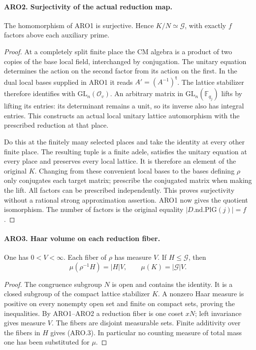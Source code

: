 \paragraph{ARO2. Surjectivity of the actual reduction map.}
\label{claim:ARO2}
The homomorphism of ARO1 is surjective.  Hence
\(K/N\simeq\mathcal G\), with exactly \(f\) factors above each
auxiliary prime.
\begin{proof}
At a completely split finite place the CM algebra is a product of
two copies of the base local field, interchanged by conjugation.
The unitary equation determines the action on the second factor
from its action on the first.  In the dual local bases supplied in
ARO1 it reads \(A'=(A^{-1})^{\mathsf t}\).  The lattice stabilizer
therefore identifies with \(\mathrm{GL}_n(\mathcal O_v)\).
An arbitrary matrix in \(\mathrm{GL}_n(\mathbb F_{q_j})\) lifts by
lifting its entries: its determinant remains a unit, so its inverse
also has integral entries.  This constructs an actual local unitary
lattice automorphism with the prescribed reduction at that place.

Do this at the finitely many selected places and take the identity
at every other finite place.  The resulting tuple is a finite adele,
satisfies the unitary equation at every place and preserves every
local lattice.  It is therefore an element of the original \(K\).
Changing from these convenient local bases to the bases defining
\(\rho\) only conjugates each target matrix; prescribe the conjugated
matrix when making the lift.  All factors can be prescribed
independently.  This proves surjectivity without a rational strong
approximation assertion.  ARO1 now gives the quotient isomorphism.
The number of factors is the original equality
\(|D.\mathrm{nd}.\mathrm{PlG}(j)|=f\).
\end{proof}

\paragraph{ARO3. Haar volume on each reduction fiber.}
\label{claim:ARO3}
One has \(0<V<\infty\).  Each fiber of \(\rho\) has measure \(V\).
If \(H\leq\mathcal G\), then
\[
 \mu(\rho^{-1}H)=|H|V,
 \qquad \mu(K)=|\mathcal G|V.                         \tag{ARO.3}
\]
\begin{proof}
The congruence subgroup \(N\) is open and contains the identity.
It is a closed subgroup of the compact lattice stabilizer \(K\).
A nonzero Haar measure is positive on every nonempty open set and
finite on compact sets, proving the inequalities.  By ARO1--ARO2
a reduction fiber is one coset \(xN\); left invariance gives measure
\(V\).  The fibers are disjoint measurable sets.  Finite additivity
over the fibers in \(H\) gives (ARO.3).  In particular no counting
measure of total mass one has been substituted for \(\mu\).
\end{proof}

